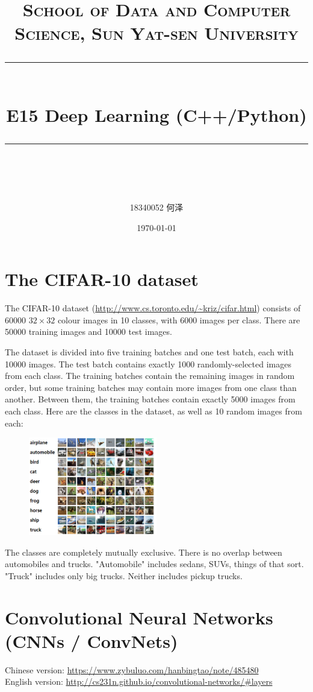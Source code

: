 \documentclass[a4paper, 11pt]{article}
\title{	
\normalfont \normalsize
\textsc{School of Data and Computer Science, Sun Yat-sen University} \\ [25pt] %
\rule{\textwidth}{0.5pt} \\[0.4cm] %
\huge  E15 Deep Learning (C++/Python)\\ %
\rule{\textwidth}{2pt} \\[0.5cm] %
\author{18340052  何泽}
\date{\normalsize\today}
}
\begin{document}
\maketitle
\tableofcontents
\newpage
\section{The CIFAR-10 dataset}
The CIFAR-10 dataset (\url{http://www.cs.toronto.edu/~kriz/cifar.html}) consists of 60000 $32\times 32$ colour images in 10 classes, with 6000 images per class. There are 50000 training images and 10000 test images. 

The dataset is divided into five training batches and one test batch, each with 10000 images. The test batch contains exactly 1000 randomly-selected images from each class. The training batches contain the remaining images in random order, but some training batches may contain more images from one class than another. Between them, the training batches contain exactly 5000 images from each class. Here are the classes in the dataset, as well as 10 random images from each:
\begin{figure}[ht]
\centering
\includegraphics[width=0.5\textwidth]{Pic/cifar}
\end{figure}

The classes are completely mutually exclusive. There is no overlap between automobiles and trucks. "Automobile" includes sedans, SUVs, things of that sort. "Truck" includes only big trucks. Neither includes pickup trucks.
\section{Convolutional Neural Networks (CNNs / ConvNets)}
Chinese version: \url{https://www.zybuluo.com/hanbingtao/note/485480}\\
English version: \url{http://cs231n.github.io/convolutional-networks/#layers}
\end{document}
